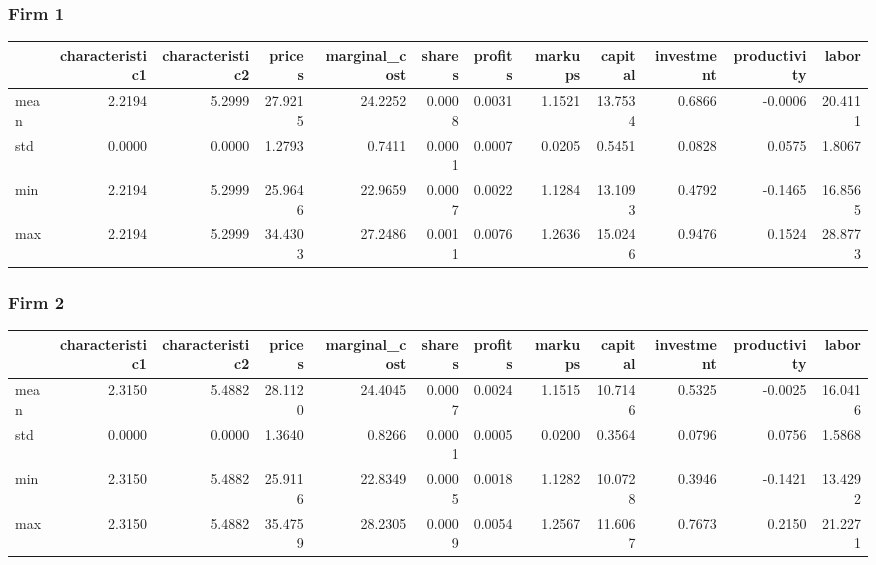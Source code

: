  \subsubsection*{Firm 1}
\begin{tabular}{lrrrrrrrrrrr}
\toprule
{} &  characteristic1 &  characteristic2 &  prices &  marginal\_cost &  shares &  profits &  markups &  capital &  investment &  productivity &   labor \\
\midrule
mean &           2.2194 &           5.2999 & 27.9215 &        24.2252 &  0.0008 &   0.0031 &   1.1521 &  13.7534 &      0.6866 &       -0.0006 & 20.4111 \\
std  &           0.0000 &           0.0000 &  1.2793 &         0.7411 &  0.0001 &   0.0007 &   0.0205 &   0.5451 &      0.0828 &        0.0575 &  1.8067 \\
min  &           2.2194 &           5.2999 & 25.9646 &        22.9659 &  0.0007 &   0.0022 &   1.1284 &  13.1093 &      0.4792 &       -0.1465 & 16.8565 \\
max  &           2.2194 &           5.2999 & 34.4303 &        27.2486 &  0.0011 &   0.0076 &   1.2636 &  15.0246 &      0.9476 &        0.1524 & 28.8773 \\
\bottomrule
\end{tabular}


 \subsubsection*{Firm 2}
\begin{tabular}{lrrrrrrrrrrr}
\toprule
{} &  characteristic1 &  characteristic2 &  prices &  marginal\_cost &  shares &  profits &  markups &  capital &  investment &  productivity &   labor \\
\midrule
mean &           2.3150 &           5.4882 & 28.1120 &        24.4045 &  0.0007 &   0.0024 &   1.1515 &  10.7146 &      0.5325 &       -0.0025 & 16.0416 \\
std  &           0.0000 &           0.0000 &  1.3640 &         0.8266 &  0.0001 &   0.0005 &   0.0200 &   0.3564 &      0.0796 &        0.0756 &  1.5868 \\
min  &           2.3150 &           5.4882 & 25.9116 &        22.8349 &  0.0005 &   0.0018 &   1.1282 &  10.0728 &      0.3946 &       -0.1421 & 13.4292 \\
max  &           2.3150 &           5.4882 & 35.4759 &        28.2305 &  0.0009 &   0.0054 &   1.2567 &  11.6067 &      0.7673 &        0.2150 & 21.2271 \\
\bottomrule
\end{tabular}


